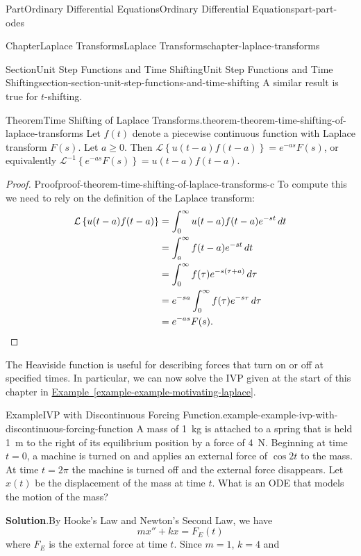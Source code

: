 \documentclass[twoside,10pt,]{book}
\newcommand{\blocktitlefont}{\relax}
\newcommand{\xreffont}{\relax}
\numberwithin{equation}{part}
\newcommand{\qedhere}{\relax}
\newcommand{\Laplace}[1]{\mathcal{L}\set{#1}}
\newcommand{\iLaplace}[1]{\mathcal{L}^{-1}\set{#1}}
\newcommand{\set}[1]{\left\{ #1 \right\}}
\begin{document}
\begin{partptx}{Part}{Ordinary Differential Equations}{}{Ordinary Differential Equations}{}{}{part-part-odes}
\begin{chapterptx}{Chapter}{Laplace Transforms}{}{Laplace Transforms}{}{}{chapter-laplace-transforms}
\begin{sectionptx}{Section}{Unit Step Functions and Time Shifting}{}{Unit Step Functions and Time Shifting}{}{}{section-section-unit-step-functions-and-time-shifting}
A similar result is true for \(t\)-shifting.%
\begin{theorem}{Theorem}{Time Shifting of Laplace Transforms.}{}{theorem-theorem-time-shifting-of-laplace-transforms}%
Let \(f(t)\) denote a piecewise continuous function with Laplace transform \(F(s)\). Let \(a\geq0\). Then \(\Laplace{u(t-a)f(t-a)} = e^{-as}F(s)\), or equivalently \(\iLaplace{e^{-as}F(s)} = u(t-a)f(t-a)\).%
\end{theorem}
\begin{proof}{Proof}{}{proof-theorem-time-shifting-of-laplace-transforms-c}
To compute this we need to rely on the definition of the Laplace transform:%
\begin{align*}
\Laplace{u(t-a)f(t-a)} &= \int_{0}^{\infty}u(t-a)f(t-a)e^{-st}\,dt\\
&= \int_{a}^{\infty}f(t-a)e^{-st}\,dt\\
&= \int_{0}^{\infty}f(\tau)e^{-s(\tau+a)}\,d\tau\\
&= e^{-sa}\int_{0}^{\infty}f(\tau)e^{-s\tau}\,d\tau\\
&= e^{-as}F(s)\text{.}\qedhere
\end{align*}
%
\end{proof}
The Heaviside function is useful for describing forces that turn on or off at specified times. In particular, we can now solve the IVP given at the start of this chapter in \hyperref[example-example-motivating-laplace]{Example~{\xreffont\ref{example-example-motivating-laplace}}}.%
\begin{example}{Example}{IVP with Discontinuous Forcing Function.}{example-example-ivp-with-discontinuous-forcing-function}%
A mass of \SI{1}{\kilogram} is attached to a spring that is held \SI{1}{\meter} to the right of its equilibrium position by a force of \SI{4}{\newton}. Beginning at time \(t=0\), a machine is turned on and applies an external force of \(\cos2t\) to the mass. At time \(t=2\pi\) the machine is turned off and the external force disappears. Let \(x(t)\) be the displacement of the mass at time \(t\). What is an ODE that models the motion of the mass?%
\par\smallskip%
\noindent\textbf{\blocktitlefont Solution}.\hypertarget{solution-example-ivp-with-discontinuous-forcing-function-c}{}\quad{}By Hooke's Law and Newton's Second Law, we have%
\begin{equation*}
mx''+kx = F_{E}(t)
\end{equation*}
where \(F_{E}\) is the external force at time \(t\). Since \(m = 1\), \(k = 4\) and%
\begin{equation*}

\end{equation*}
\end{example}
\end{sectionptx}
\end{chapterptx}
\end{partptx}
\end{document}
